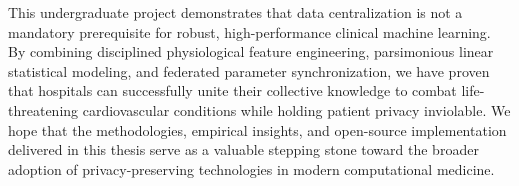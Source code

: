 \documentclass[12pt,a4paper,oneside]{report}
\begin{document}
This undergraduate project demonstrates that data centralization is not a mandatory prerequisite for robust, high-performance clinical machine learning. By combining disciplined physiological feature engineering, parsimonious linear statistical modeling, and federated parameter synchronization, we have proven that hospitals can successfully unite their collective knowledge to combat life-threatening cardiovascular conditions while holding patient privacy inviolable. We hope that the methodologies, empirical insights, and open-source implementation delivered in this thesis serve as a valuable stepping stone toward the broader adoption of privacy-preserving technologies in modern computational medicine.



\cleardoublepage
{}
{}
\end{document}
